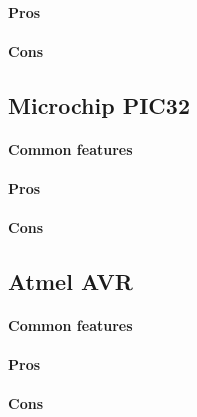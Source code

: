 \documentclass[a4paper,10pt]{article}
\begin{document}
\begin{multicols}{2}
\paragraph{Pros}
\TODO


\paragraph{Cons}
\TODO


\subsection{Microchip PIC32}

\TODO


\paragraph{Common features}
\TODO


\paragraph{Pros}
\TODO


\paragraph{Cons}
\TODO


\subsection{Atmel AVR}

\TODO


\paragraph{Common features}
\TODO


\paragraph{Pros}
\TODO


\paragraph{Cons}
\TODO



\end{multicols}
\end{document}
